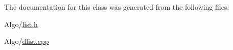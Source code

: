 The documentation for this class was generated from the following files\-:\begin{DoxyCompactItemize}
\item 
Algo/\hyperlink{list_8h}{list.\-h}\item 
Algo/\hyperlink{dlist_8cpp}{dlist.\-cpp}\end{DoxyCompactItemize}
